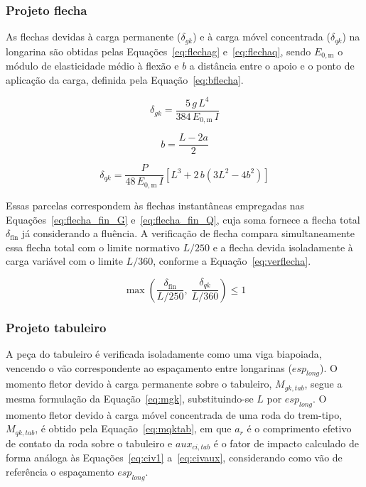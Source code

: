 \subsubsection{Projeto flecha}

As flechas devidas à carga permanente ($\delta_{gk}$) e à carga móvel concentrada ($\delta_{qk}$) na longarina são obtidas pelas Equações~\eqref{eq:flechag} e~\eqref{eq:flechaq}, sendo $E_{0,\mathrm{m}}$ o módulo de elasticidade médio à flexão e $b$ a distância entre o apoio e o ponto de aplicação da carga, definida pela Equação~\eqref{eq:bflecha}.

\begin{equation}
\delta_{gk} = \frac{5\,g\,L^4}{384\,E_{0,\mathrm{m}}\,I}
\label{eq:flechag}
\end{equation}

\begin{equation}
b = \frac{L - 2a}{2}
\label{eq:bflecha}
\end{equation}

\begin{equation}
\delta_{qk} = \frac{P}{48\,E_{0,\mathrm{m}}\,I}\left[L^3 + 2\,b\left(3L^2 - 4b^2\right)\right]
\label{eq:flechaq}
\end{equation}

Essas parcelas correspondem às flechas instantâneas empregadas nas Equações~\eqref{eq:flecha_fin_G} e~\eqref{eq:flecha_fin_Q}, cuja soma fornece a flecha total $\delta_{\mathrm{fin}}$ já considerando a fluência.
A verificação de flecha compara simultaneamente essa flecha total com o limite normativo $L/250$ e a flecha devida isoladamente à carga variável com o limite $L/360$, conforme a Equação~\eqref{eq:verflecha}.

\begin{equation}
\max\left(\frac{\delta_{\mathrm{fin}}}{L/250},\ \frac{\delta_{qk}}{L/360}\right) \leq 1
\label{eq:verflecha}
\end{equation}

\subsubsection{Projeto tabuleiro}

A peça do tabuleiro é verificada isoladamente como uma viga biapoiada, vencendo o vão correspondente ao espaçamento entre longarinas ($esp_{long}$).
O momento fletor devido à carga permanente sobre o tabuleiro, $M_{gk,tab}$, segue a mesma formulação da Equação~\eqref{eq:mgk}, substituindo-se $L$ por $esp_{long}$.
O momento fletor devido à carga móvel concentrada de uma roda do trem-tipo, $M_{qk,tab}$, é obtido pela Equação~\eqref{eq:mqktab}, em que $a_r$ é o comprimento efetivo de contato da roda sobre o tabuleiro e $aux_{ci,tab}$ é o fator de impacto calculado de forma análoga às Equações~\eqref{eq:civ1} a~\eqref{eq:civaux}, considerando como vão de referência o espaçamento $esp_{long}$.

